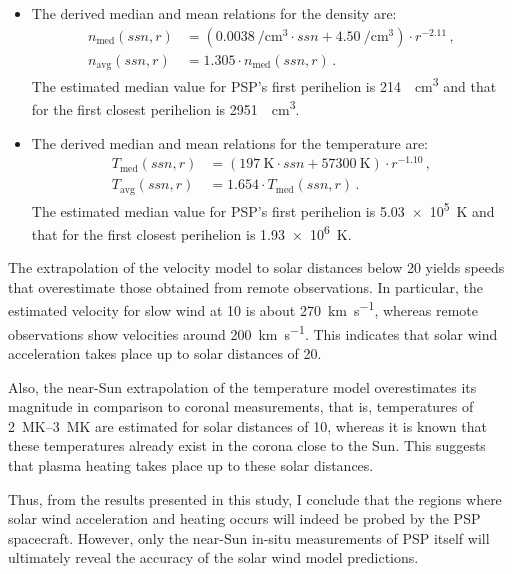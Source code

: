 \begin{itemize}
	\item The derived median and mean relations for the density are:
	\begin{align*}
		n_\text{med}(ssn,r) &= \left(\SI{0.0038}{\per\cm\cubed} \cdot ssn + \SI{4.50}{\per\cm\cubed}\right) \cdot r^{-2.11}	\,,\\
		n_\text{avg}(ssn,r) &= 1.305 \cdot n_\text{med}(ssn,r)	\,.
	\end{align*}
	 The estimated median value for PSP's first perihelion is \SI{214}{\per\cm\cubed} and that for the first closest perihelion is \SI{2951}{\per\cm\cubed}.
	
	\item The derived median and mean relations for the temperature are:
	\begin{align*}
		T_\text{med}(ssn,r) &= (\SI{197}{\K} \cdot ssn + \SI{57300}{\K}) \cdot r^{-1.10}	\,,\\
		T_\text{avg}(ssn,r) &= 1.654 \cdot T_\text{med}(ssn,r)\,.
	\end{align*}
	 The estimated median value for PSP's first perihelion is \SI{5.03e5}{\kelvin} and that for the first closest perihelion is \SI{1.93e6}{\kelvin}.
\end{itemize}

\medskip

The extrapolation of the velocity model to solar distances below \SI{20}{\Rs} yields speeds that overestimate those obtained from remote observations. In particular, the estimated velocity for slow wind at \SI{10}{\Rs} is about \SI{270}{\km\per\s}, whereas remote observations show velocities around \SI{200}{\km\per\s}. This indicates that solar wind acceleration takes place up to solar distances of \SI{20}{\Rs}.

Also, the near-Sun extrapolation of the temperature model overestimates its magnitude in comparison to coronal measurements, that is, temperatures of \SIrange{2}{3}{\mega\kelvin} are estimated for solar distances of \SI{10}{\Rs}, whereas it is known that these temperatures already exist in the corona close to the Sun. This suggests that plasma heating takes place up to these solar distances.

Thus, from the results presented in this study, I conclude that the regions where solar wind acceleration and heating occurs will indeed be probed by the PSP spacecraft. However, only the near-Sun in-situ measurements of PSP itself will ultimately reveal the accuracy of the solar wind model predictions.

\bigskip

